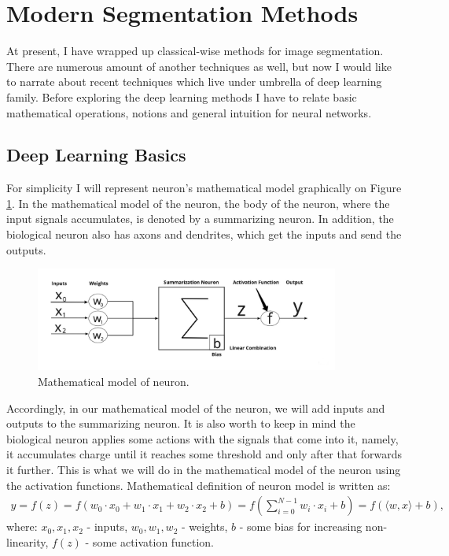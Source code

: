 \section{Modern Segmentation Methods}
At present, I have wrapped up classical-wise methods for image segmentation. There are numerous amount of another techniques as well, but now I would like to narrate about recent techniques which live under umbrella of deep learning family. Before exploring the deep learning methods I have to relate basic mathematical operations, notions and general intuition for neural networks.        

\subsection{Deep Learning Basics}
For simplicity I will represent neuron's mathematical model graphically on Figure \ref{fig:neuron}. In the mathematical model of the neuron, the body of the neuron, where the input signals accumulates, is denoted by a summarizing neuron. In addition, the biological neuron also has axons and dendrites, which get the inputs and send the outputs. 

\begin{figure}[h]
    \centering \includegraphics[width=10cm]{images/neuron_math_model.jpeg}
    \caption {Mathematical model of neuron.}
    \label{fig:neuron}
\end{figure} 

Accordingly, in our mathematical model of the neuron, we will add inputs and outputs to the summarizing neuron. It is also worth to keep in mind the biological neuron applies some actions with the signals that come into it, namely, it accumulates charge until it reaches some threshold and only after that forwards it further. This is what we will do in the mathematical model of the neuron using the activation functions. Mathematical definition of neuron model is written as:
\begin{align*}
y = f(z) = f(w_0 \cdot x_0+w_1 \cdot x_1+w_2 \cdot x_2+b) = f(\sum\limits_{i=0}^{N-1} w_i \cdot x_i+b) = f(\langle w, x \rangle + b),
\end{align*}
where: $x_0, x_1, x_2$ - inputs, $w_0, w_1, w_2$ - weights,  $b$ - some bias for increasing non-linearity, $f(z)$ - some activation function. 

